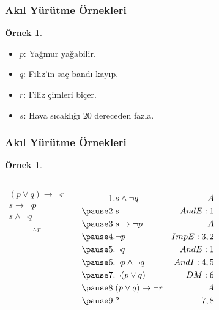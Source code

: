 \documentclass[dvipsnames]{beamer}
\theoremstyle{definition}
\theoremstyle{example}
\newtheorem{ornek}[theorem]{Örnek}
\theoremstyle{plain}
\begin{document}
\begin{frame}
  \frametitle{Akıl Yürütme Örnekleri}

  \begin{ornek}
    \begin{itemize}
      \item $p$: Yağmur yağabilir.
      \item $q$: Filiz'in saç bandı kayıp.
      \item $r$: Filiz çimleri biçer.
      \item $s$: Hava sıcaklığı 20 dereceden fazla.
    \end{itemize}
  \end{ornek}
\end{frame}

\begin{frame}
  \frametitle{Akıl Yürütme Örnekleri}

  \begin{ornek}
    \begin{columns}
      \[
      \frac
        {
          \begin{array}{c}
            (p \vee q) \rightarrow \neg r\\
            s \rightarrow \neg p\\
            s \wedge \neg q
          \end{array}
        }
        {
          \therefore r
        }
      \]

      \pause
      \begin{eqnarray*}
        1. & s \wedge \neg q                & A\\
        \pause
        2. & s                              & AndE:1\\
        \pause
        3. & s \rightarrow \neg p           & A\\
        \pause
        4. & \neg p                         & ImpE:3,2\\
        \pause
        5. & \neg q                         & AndE:1\\
        \pause
        6. & \neg p \wedge \neg q           & AndI:4,5\\
        \pause
        7. & \neg (p \vee q)                & DM:6\\
        \pause
        8. & (p \vee q) \rightarrow \neg r  & A\\
        \pause
        9. & ?                              & 7,8
      \end{eqnarray*}
    \end{columns}
  \end{ornek}
\end{frame}
\end{document}
